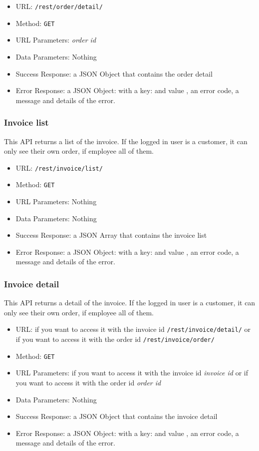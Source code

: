 \begin{itemize}
    \item URL: \texttt{/rest/order/detail/}
    \item Method: \texttt{GET}
    \item URL Parameters: \textit{order id}
    \item Data Parameters: Nothing
    \item Success Response: a JSON Object that contains the order detail
    \item Error Response: a JSON Object: with a key:   and value , an error code, a message and details of the error.
\end{itemize}


\subsubsection*{Invoice list}

This API returns a list of the invoice.
If the logged in user is a customer, it can only see their own order, if employee all of them.

\begin{itemize}
    \item URL: \texttt{/rest/invoice/list/}
    \item Method: \texttt{GET}
    \item URL Parameters: Nothing
    \item Data Parameters: Nothing
    \item Success Response:  a JSON Array that contains the invoice list
    \item Error Response: a JSON Object: with a key:   and value , an error code, a message and details of the error.
\end{itemize}

\subsubsection*{Invoice detail}

This API returns a detail of the invoice.
If the logged in user is a customer, it can only see their own order, if employee all of them.

\begin{itemize}
    \item URL: if you want to access it with the invoice id \texttt{/rest/invoice/detail/} or if you want to access it with the order id \texttt{/rest/invoice/order/}
    \item Method: \texttt{GET}
    \item URL Parameters: if you want to access it with the invoice id \textit{invoice id} or if you want to access it with the order id \textit{order id}
    \item Data Parameters: Nothing
    \item Success Response: a JSON Object that contains the invoice detail
    \item Error Response: a JSON Object: with a key:   and value , an error code, a message and details of the error.
\end{itemize}

